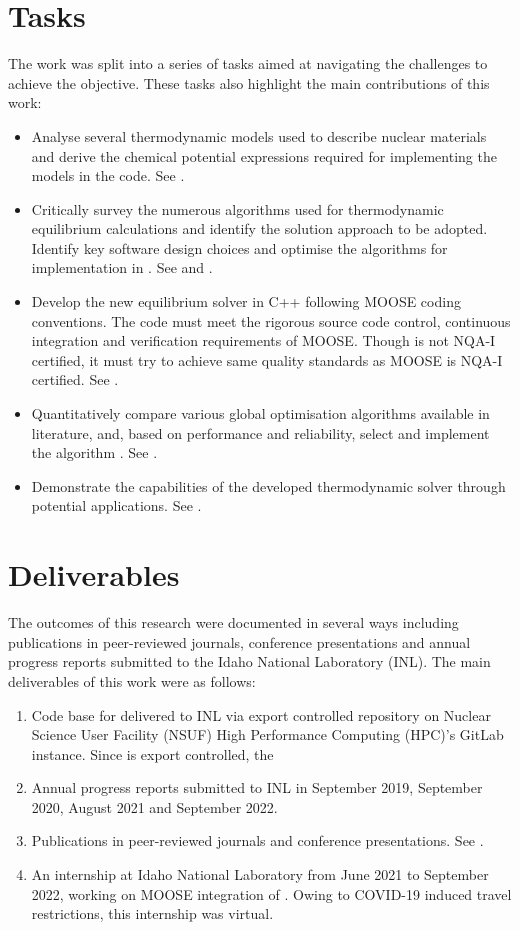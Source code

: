 \section{Tasks}
    The work was split into a series of tasks aimed at navigating the challenges to achieve the objective. These tasks also highlight the main contributions of this work:
    \begin{itemize}
        \item Analyse several thermodynamic models used to describe nuclear materials and derive the chemical potential expressions required for implementing the models in the code. See .
        \item Critically survey the numerous algorithms used for thermodynamic equilibrium calculations and identify the solution approach to be adopted. Identify key software design choices and optimise the algorithms for implementation in {\GEM}. See  and .
        \item Develop the new equilibrium solver in C++ following MOOSE coding conventions. The code must meet the rigorous source code control, continuous integration and verification requirements of MOOSE. Though {\GEM} is not NQA-I certified, it must try to achieve same quality standards as MOOSE is NQA-I certified. See .
        \item Quantitatively compare various global optimisation algorithms available in literature, and, based on performance and reliability, select and implement the algorithm {\GEM}. See .
        \item Demonstrate the capabilities of the developed thermodynamic solver through potential applications. See .
    \end{itemize}

\section{Deliverables}
	The outcomes of this research were documented in several ways including publications in peer-reviewed journals, conference presentations and annual progress reports submitted to the Idaho National Laboratory (INL). The main deliverables of this work were as follows:
	\begin{enumerate}
	\item Code base for {\GEM} delivered to INL via export controlled repository on Nuclear Science User Facility (NSUF) High Performance Computing (HPC)'s GitLab instance. Since {\YJ} is export controlled, the 
	\item Annual progress reports submitted to INL in September 2019, September 2020, August 2021 and September 2022. 
	\item Publications in peer-reviewed journals and conference presentations. See .
	\item An internship at Idaho National Laboratory from June 2021 to September 2022, working on MOOSE integration of \GEM. Owing to COVID-19 induced travel restrictions, this internship was virtual.
	\end{enumerate}
	